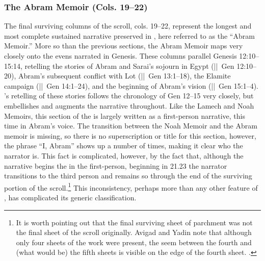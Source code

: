 \subsubsection{The Abram Memoir (Cols. 19--22)}

The final surviving columns of the scroll, cols. 19--22, represent the longest and most complete sustained narrative preserved in \ga, here referred to as the ``Abram Memoir.'' More so than the previous sections, the Abram Memoir maps very closely onto the evens narrated in Genesis. These columns parallel Genesis 12:10--15:14, retelling the stories of Abram and Sarai's sojourn in Egypt (||~Gen 12:10--20), Abram's subsequent conflict with Lot (||~Gen 13:1--18), the Elamite campaign (||~Gen 14:1--24), and the beginning of Abram's vision (||~Gen 15:1--4). \ga's retelling of these stories follows the chronology of Gen 12--15 very closely, but embellishes and augments the narrative throughout. Like the Lamech and Noah Memoirs, this section of the \ga is largely written as a first-person narrative, this time in Abram's voice. The transition between the Noah Memoir and the Abram memoir is missing, so there is no superscription or title for this section, however, the phrase ``I, Abram'' shows up a number of times, making it clear who the narrator is. This fact is complicated, however, by the fact that, although the narrative begins the in the first-person, beginning in 21.23 the narrator transitions to the third person and remains so through the end of the surviving portion of the scroll.\footnote{It is worth pointing out that the final surviving sheet of parchment was not the final sheet of the scroll originally. Avigad and Yadin note that although only four sheets of the work were present, the seem between the fourth and (what would be) the fifth sheets is visible on the edge of the fourth sheet. \cite*[14]{avigad-yadin1956}.} This inconsistency, perhaps more than any other feature of \ga, has complicated its generic classification.

